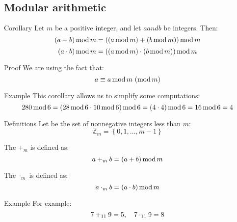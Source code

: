 \documentclass[a4paper]{article}
\begin{document}
\subsection{Modular arithmetic}
\begin{parag}{Corollary}
    Let $m$ be a positive integer, and let $a and b$ be integers. Then: 
    \[\left(a + b\right) \Mod m = \left(\left(a \Mod m\right) + \left(b \Mod m\right)\right) \Mod m\]
    \[\left(a \cdot b\right) \Mod m = \left(\left(a \Mod m\right) \cdot \left(b \Mod m\right)\right) \Mod m\]

    \begin{subparag}{Proof}
        We are using the fact that: 
        \[a \equiv a \operatorname{mod} m\ (\operatorname{mod} m)\]
    \end{subparag}
\end{parag}

\begin{parag}{Example}
    This corollary allows us to simplify some computations:
    \[280 \Mod 6 = \left(28 \Mod 6 \cdot 10 \Mod 6\right) \Mod 6 = \left(4 \cdot 4\right) \Mod 6 = 16 \Mod 6 = 4\]
\end{parag}


\begin{parag}{Definitions}
    Let  be the set of nonnegative integers less than $m$: 
    \[\mathbb{Z}_m = \left\{0, 1, \ldots, m - 1\right\}\]
    
    The  $+_m$ is defined as: 
    \[a +_m b = \left(a + b\right) \Mod m\]

    The  $\cdot_m$ is defined as: 
    \[a \cdot_m b = \left(a\cdot b\right) \Mod m\]
\end{parag}

\begin{parag}{Example}
    For example: 
    \[7 +_{11} 9 = 5, \quad 7 \cdot_{11} 9 = 8\]
\end{parag}
\end{document}

